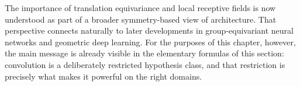 \medskip

The importance of translation equivariance and local receptive fields is now understood as part of a broader symmetry-based view of architecture.
That perspective connects naturally to later developments in group-equivariant neural networks and geometric deep learning.
For the purposes of this chapter, however, the main message is already visible in the elementary formulas of this section:
convolution is a deliberately restricted hypothesis class, and that restriction is precisely what makes it powerful on the right domains.
